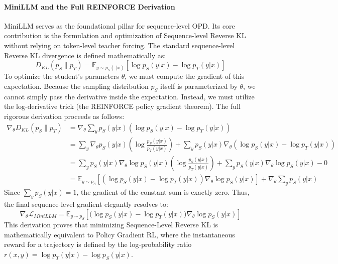 \paragraph{MiniLLM and the Full REINFORCE Derivation}
MiniLLM \citep{2306.08543} serves as the foundational pillar for sequence-level OPD. Its core contribution is the formulation and optimization of Sequence-level Reverse KL without relying on token-level teacher forcing.
The standard sequence-level Reverse KL divergence is defined mathematically as:
\begin{equation}
    D_{KL}(p_S \parallel p_T) = \mathbb{E}_{y \sim p_S(\cdot|x)} \left[ \log p_S(y|x) - \log p_T(y|x) \right]
\end{equation}
To optimize the student's parameters $\theta$, we must compute the gradient of this expectation. Because the sampling distribution $p_S$ itself is parameterized by $\theta$, we cannot simply pass the derivative inside the expectation. Instead, we must utilize the log-derivative trick (the REINFORCE policy gradient theorem). The full rigorous derivation proceeds as follows:
\begin{align}
    \nabla_\theta D_{KL}(p_S \parallel p_T) &= \nabla_\theta \sum_y p_S(y|x) \left( \log p_S(y|x) - \log p_T(y|x) \right) \nonumber \\
    &= \sum_y \nabla_\theta p_S(y|x) \left( \log \frac{p_S(y|x)}{p_T(y|x)} \right) + \sum_y p_S(y|x) \nabla_\theta \left( \log p_S(y|x) - \log p_T(y|x) \right) \nonumber \\
    &= \sum_y p_S(y|x) \nabla_\theta \log p_S(y|x) \left( \log \frac{p_S(y|x)}{p_T(y|x)} \right) + \sum_y p_S(y|x) \nabla_\theta \log p_S(y|x) - 0 \nonumber \\
    &= \mathbb{E}_{y \sim p_S} \left[ \left( \log p_S(y|x) - \log p_T(y|x) \right) \nabla_\theta \log p_S(y|x) \right] + \nabla_\theta \sum_y p_S(y|x)
\end{align}
Since $\sum_y p_S(y|x) = 1$, the gradient of the constant sum is exactly zero. Thus, the final sequence-level gradient elegantly resolves to:
\begin{equation}
    \nabla_\theta \mathcal{L}_{MiniLLM} = \mathbb{E}_{y \sim p_S} \left[ \Big( \log p_S(y|x) - \log p_T(y|x) \Big) \nabla_\theta \log p_S(y|x) \right]
    \label{eq:minillm_final}
\end{equation}
This derivation proves that minimizing Sequence-Level Reverse KL is mathematically equivalent to Policy Gradient RL, where the instantaneous reward for a trajectory is defined by the log-probability ratio $r(x, y) = \log p_T(y|x) - \log p_S(y|x)$.

